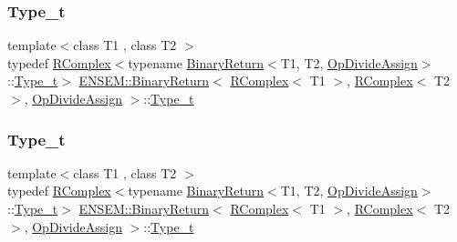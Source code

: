 \subsubsection{\texorpdfstring{Type\_t}{Type\_t}\hspace{0.1cm}{\footnotesize\ttfamily [2/3]}}
{\footnotesize\ttfamily template$<$class T1 , class T2 $>$ \\
typedef \mbox{\hyperlink{classENSEM_1_1RComplex}{R\+Complex}}$<$typename \mbox{\hyperlink{structENSEM_1_1BinaryReturn}{Binary\+Return}}$<$T1, T2, \mbox{\hyperlink{structENSEM_1_1OpDivideAssign}{Op\+Divide\+Assign}}$>$\+::\mbox{\hyperlink{structENSEM_1_1BinaryReturn_3_01RComplex_3_01T1_01_4_00_01RComplex_3_01T2_01_4_00_01OpDivideAssign_01_4_af46687e10b8bd51c6624cbfdfd75e9ec}{Type\+\_\+t}}$>$ \mbox{\hyperlink{structENSEM_1_1BinaryReturn}{E\+N\+S\+E\+M\+::\+Binary\+Return}}$<$ \mbox{\hyperlink{classENSEM_1_1RComplex}{R\+Complex}}$<$ T1 $>$, \mbox{\hyperlink{classENSEM_1_1RComplex}{R\+Complex}}$<$ T2 $>$, \mbox{\hyperlink{structENSEM_1_1OpDivideAssign}{Op\+Divide\+Assign}} $>$\+::\mbox{\hyperlink{structENSEM_1_1BinaryReturn_3_01RComplex_3_01T1_01_4_00_01RComplex_3_01T2_01_4_00_01OpDivideAssign_01_4_af46687e10b8bd51c6624cbfdfd75e9ec}{Type\+\_\+t}}}

\mbox{\label{structENSEM_1_1BinaryReturn_3_01RComplex_3_01T1_01_4_00_01RComplex_3_01T2_01_4_00_01OpDivideAssign_01_4_af46687e10b8bd51c6624cbfdfd75e9ec}} 
\subsubsection{\texorpdfstring{Type\_t}{Type\_t}\hspace{0.1cm}{\footnotesize\ttfamily [3/3]}}
{\footnotesize\ttfamily template$<$class T1 , class T2 $>$ \\
typedef \mbox{\hyperlink{classENSEM_1_1RComplex}{R\+Complex}}$<$typename \mbox{\hyperlink{structENSEM_1_1BinaryReturn}{Binary\+Return}}$<$T1, T2, \mbox{\hyperlink{structENSEM_1_1OpDivideAssign}{Op\+Divide\+Assign}}$>$\+::\mbox{\hyperlink{structENSEM_1_1BinaryReturn_3_01RComplex_3_01T1_01_4_00_01RComplex_3_01T2_01_4_00_01OpDivideAssign_01_4_af46687e10b8bd51c6624cbfdfd75e9ec}{Type\+\_\+t}}$>$ \mbox{\hyperlink{structENSEM_1_1BinaryReturn}{E\+N\+S\+E\+M\+::\+Binary\+Return}}$<$ \mbox{\hyperlink{classENSEM_1_1RComplex}{R\+Complex}}$<$ T1 $>$, \mbox{\hyperlink{classENSEM_1_1RComplex}{R\+Complex}}$<$ T2 $>$, \mbox{\hyperlink{structENSEM_1_1OpDivideAssign}{Op\+Divide\+Assign}} $>$\+::\mbox{\hyperlink{structENSEM_1_1BinaryReturn_3_01RComplex_3_01T1_01_4_00_01RComplex_3_01T2_01_4_00_01OpDivideAssign_01_4_af46687e10b8bd51c6624cbfdfd75e9ec}{Type\+\_\+t}}}



